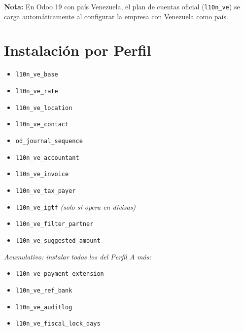 \documentclass[11pt,a4paper]{article}
\newcommand{\modulo}[1]{\texttt{\textcolor{naranja}{#1}}}
\begin{document}
\begin{Form}
\vspace{10pt}
\begin{tcolorbox}[colback=naranjaclaro!30, colframe=naranja, boxrule=0.8pt, arc=3pt]
  \textbf{Nota:} En Odoo 19 con país Venezuela, el plan de cuentas oficial (\modulo{l10n\_ve}) se carga automáticamente al configurar la empresa con Venezuela como país.
\end{tcolorbox}

\clearpage

\section{Instalación por Perfil}

\begin{tcolorbox}[perfilbox, title={Perfil A — Módulos a instalar}]
\begin{itemize}[leftmargin=1.2em, itemsep=3pt]
  \item \modulo{l10n\_ve\_base}
  \item \modulo{l10n\_ve\_rate}
  \item \modulo{l10n\_ve\_location}
  \item \modulo{l10n\_ve\_contact}
  \item \modulo{od\_journal\_sequence}
  \item \modulo{l10n\_ve\_accountant}
  \item \modulo{l10n\_ve\_invoice}
  \item \modulo{l10n\_ve\_tax\_payer}
  \item \modulo{l10n\_ve\_igtf} \textit{(solo si opera en divisas)}
  \item \modulo{l10n\_ve\_filter\_partner}
  \item \modulo{l10n\_ve\_suggested\_amount}
\end{itemize}
\end{tcolorbox}

\vspace{6pt}

\begin{tcolorbox}[perfilbox, title={Perfil B — Módulos adicionales sobre Perfil A}]
\textit{Acumulativo: instalar todos los del Perfil A más:}
\begin{itemize}[leftmargin=1.2em, itemsep=3pt]
  \item[+] \modulo{l10n\_ve\_payment\_extension}
  \item[+] \modulo{l10n\_ve\_ref\_bank}
  \item[+] \modulo{l10n\_ve\_auditlog}
  \item[+] \modulo{l10n\_ve\_fiscal\_lock\_days}
\end{itemize}
\end{tcolorbox}


\end{Form}
\end{document}
